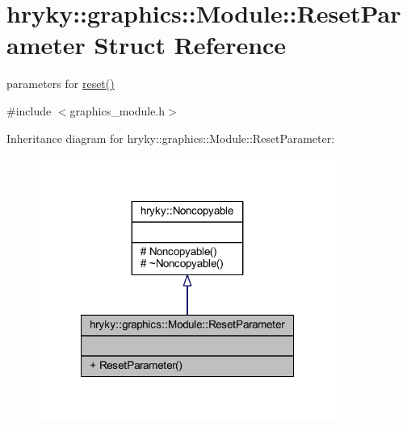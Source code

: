 \hypertarget{structhryky_1_1graphics_1_1_module_1_1_reset_parameter}{\section{hryky\-:\-:graphics\-:\-:Module\-:\-:Reset\-Parameter Struct Reference}
\label{structhryky_1_1graphics_1_1_module_1_1_reset_parameter}
}


parameters for \hyperlink{classhryky_1_1graphics_1_1_module_a5c8abe754f63338ef1f62392e93e3306}{reset()}  




{\ttfamily \#include $<$graphics\-\_\-module.\-h$>$}



Inheritance diagram for hryky\-:\-:graphics\-:\-:Module\-:\-:Reset\-Parameter\-:\nopagebreak
\begin{figure}[H]
\begin{center}
\leavevmode
\includegraphics[width=276pt]{structhryky_1_1graphics_1_1_module_1_1_reset_parameter__inherit__graph}
\end{center}
\end{figure}
